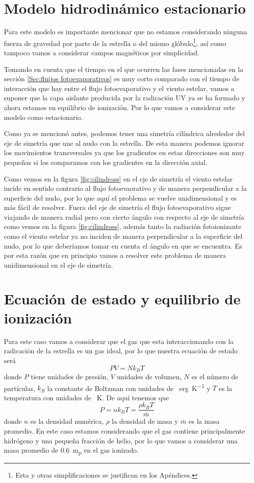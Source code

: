 \documentclass{book}
\begin{document}
\section{Modelo hidrodinámico estacionario}

Para este modelo es importante mencionar que no estamos considerando ninguna fuerza de gravedad por parte de la estrella o del mismo glóbulo\footnote{Esta y otras simplificaciones se justifican en los Apéndices.}, así como tampoco vamos a considerar campos magnéticos por simplicidad.

Tomando en cuenta que el tiempo en el que ocurren las fases mencionadas en la sección \ref{Sec:fluijos fotoevaporativos} es muy corto comparado con el tiempo de interacción que hay entre el flujo fotoevaporativo y el viento estelar, vamos a suponer que la capa aislante producida por la radicación UV ya se ha formado y ahora estamos en equilibrio de ionización. Por lo que vamos a considerar este modelo como estacionario. 

Como ya se mencionó antes, podemos tener una simetría cilíndrica alrededor del eje de simetría que une al nudo con la estrella. De esta manera podemos ignorar los movimientos transversales ya que los gradientes en estas direcciones son muy pequeñas si los comparamos con los gradientes en la dirección axial.

Como vemos en la figura \ref{fig:cilindross} en el eje de simetría el viento estelar incide en sentido contrario al flujo fotoevaorativo y de manera perpendicular a la superficie del nudo, por lo que aquí el problema se vuelve unidimensional y es más fácil de resolver. Fuera del eje de simetría el flujo fotoevaporativo sigue viajando de manera radial pero con cierto ángulo con respecto al eje de simetría como vemos en la figura \ref{fig:cilindross}, además tanto la radiación fotoionizante como el viento estelar ya no inciden de manera perpendicular a la superficie del nudo, por lo que deberíamos tomar en cuenta el ángulo en que se encuentra. Es por esta razón que en principio vamos a resolver este problema de manera unidimensional en el eje de simetría.


\section{Ecuación de estado y equilibrio de ionización}

Para este caso vamos a considerar que el gas que esta interaccionando con la radicación de la estrella es un gas ideal, por lo que nuestra ecuación de estado será
\[PV = Nk_BT\] donde $P$ tiene unidades de presión, $V$ unidades de volumen, $N$ es el número de partículas, $k_B$ la constante de Boltzman con unidades de \SI{}{erg.K^{-1}} y $T$ es la temperatura con unidades de \SI{}{K}. De aquí tenemos que \[P = nk_BT = \frac{\rho k_B T}{\bar{m}}\] donde $n$ es la densidad numérica, $\rho$ la densidad de masa y $\bar{m}$ es la masa promedio. En este caso estamos considerando que el gas contiene principalmente hidrógeno y una pequeña fracción de helio, por lo que vamos a considerar una masa promedio de \SI{0.6}{m_{p}} en el gas ionizado.
\end{document}
